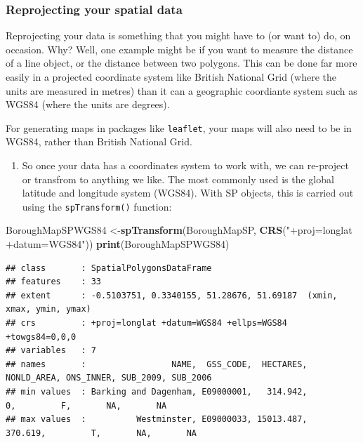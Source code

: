 \documentclass[]{book}
\newenvironment{Shaded}{\begin{snugshade}}{\end{snugshade}}
\newcommand{\KeywordTok}[1]{\textcolor[rgb]{0.13,0.29,0.53}{\textbf{#1}}}
\newcommand{\NormalTok}[1]{#1}
\newcommand{\StringTok}[1]{\textcolor[rgb]{0.31,0.60,0.02}{#1}}
\providecommand{\tightlist}{%
  \setlength{\itemsep}{0pt}\setlength{\parskip}{0pt}}
\begin{document}
\hypertarget{reprojecting-your-spatial-data}{%
\subsubsection{Reprojecting your spatial data}\label{reprojecting-your-spatial-data}}

Reprojecting your data is something that you might have to (or want to) do, on occasion. Why? Well, one example might be if you want to measure the distance of a line object, or the distance between two polygons. This can be done far more easily in a projected coordinate system like British National Grid (where the units are measured in metres) than it can a geographic coordiante system such as WGS84 (where the units are degrees).

For generating maps in packages like \texttt{leaflet}, your maps will also need to be in WGS84, rather than British National Grid.

\begin{enumerate}
\def\labelenumi{\arabic{enumi}.}
\setcounter{enumi}{27}
\tightlist
\item
  So once your data has a coordinates system to work with, we can re-project or transfrom to anything we like. The most commonly used is the global latitude and longitude system (WGS84). With SP objects, this is carried out using the \texttt{spTransform()} function:
\end{enumerate}

\begin{Shaded}
\begin{Highlighting}[]
\NormalTok{BoroughMapSPWGS84 <-}\KeywordTok{spTransform}\NormalTok{(BoroughMapSP, }\KeywordTok{CRS}\NormalTok{(}\StringTok{"+proj=longlat +datum=WGS84"}\NormalTok{))}
\KeywordTok{print}\NormalTok{(BoroughMapSPWGS84)}
\end{Highlighting}
\end{Shaded}

\begin{verbatim}
## class       : SpatialPolygonsDataFrame 
## features    : 33 
## extent      : -0.5103751, 0.3340155, 51.28676, 51.69187  (xmin, xmax, ymin, ymax)
## crs         : +proj=longlat +datum=WGS84 +ellps=WGS84 +towgs84=0,0,0 
## variables   : 7
## names       :                 NAME,  GSS_CODE,  HECTARES, NONLD_AREA, ONS_INNER, SUB_2009, SUB_2006 
## min values  : Barking and Dagenham, E09000001,   314.942,          0,         F,       NA,       NA 
## max values  :          Westminster, E09000033, 15013.487,    370.619,         T,       NA,       NA
\end{verbatim}
\end{document}
